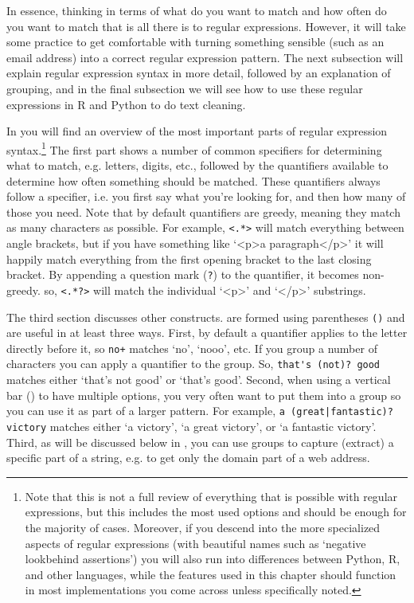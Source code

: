 In essence, thinking in terms of what do you want to match and how often do you want to match that is all there is to regular expressions.
However, it will take some practice to get comfortable with turning something sensible (such as an email address) into a correct regular expression pattern.
The next subsection will explain regular expression syntax in more detail, followed by an explanation of grouping,
and in the final subsection we will see how to use these regular expressions in R and Python to do text cleaning. 

\newcommand{\fnregexnote}{\footnote{Note that this is not a full review of everything that is possible with regular expressions, but this includes the most used options and should be enough for the majority of cases. Moreover, if you descend into the more specialized aspects of regular expressions (with beautiful names such as `negative lookbehind assertions') you will also run into differences between Python, R, and other languages, while the features used in this chapter should function in most implementations you come across unless specifically noted.}}





In  you will find an overview of the most important parts of regular expression syntax.\fnregexnote
The first part shows a number of common specifiers for determining what to match, e.g. letters, digits, etc.,
followed by the quantifiers available to determine how often something should be matched.
These quantifiers always follow a specifier, i.e. you first say what you're looking for, and then how many of those you need.
Note that by default quantifiers are greedy, meaning they match as many characters as possible.
For example, \verb|<.*>| will match everything between angle brackets, but if you have something like `<p>a paragraph</p>'
it will happily match everything from the first opening bracket to the last closing bracket.
By appending a question mark (\verb|?|) to the quantifier, it becomes non-greedy.
so, \verb|<.*?>| will match the individual `<p>' and `</p>' substrings. 

The third section discusses other constructs.
 are formed using parentheses \verb|()| and are useful in at least three ways. 
First, by default a quantifier applies to the letter directly before it, so \verb|no+| matches `no', `nooo', etc.
If you group a number of characters you can apply a quantifier to the group. So, \verb|that's (not)? good| matches either `that's not good' or `that's good'.
Second, when using a vertical bar (\textbar) to have multiple options, you very often want to put them into a group so you can use it as part of a larger pattern.
For example, \verb!a (great|fantastic)? victory! matches either `a victory', `a great victory', or `a fantastic victory'.
Third, as will be discussed below in , you can use groups to capture (extract) a specific part of a string, e.g. to get only the domain part of a web address. 

